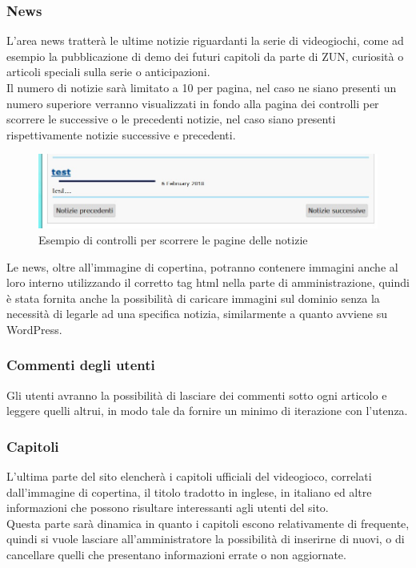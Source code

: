 \documentclass[openany, a4paper, 12pt]{report}
\begin{document}
		\subsubsection{News}
		L'area news tratterà le ultime notizie riguardanti la serie di videogiochi, come ad esempio la pubblicazione di demo dei futuri capitoli da parte di ZUN, curiosità o articoli speciali sulla serie o anticipazioni.\\
		Il numero di notizie sarà limitato a 10 per pagina, nel caso ne siano presenti un numero superiore verranno visualizzati in fondo alla pagina dei controlli per scorrere le successive o le precedenti notizie, nel caso siano presenti rispettivamente notizie successive e precedenti.
		\begin{figure}[H]
			\centering
			\includegraphics[width=0.8\linewidth]{images/precsuccnews}
			\caption{Esempio di controlli per scorrere le pagine delle notizie}
		\end{figure}
		Le news, oltre all'immagine di copertina, potranno contenere immagini anche al loro interno utilizzando il corretto tag html nella parte di amministrazione, quindi è stata fornita anche la possibilità di caricare immagini sul dominio senza la necessità di legarle ad una specifica notizia, similarmente a quanto avviene su WordPress.

		\subsubsection{Commenti degli utenti}
		Gli utenti avranno la possibilità di lasciare dei commenti sotto ogni articolo e leggere quelli altrui, in modo tale da fornire un minimo di iterazione con l'utenza.

		\subsubsection{Capitoli}
		L'ultima parte del sito elencherà i capitoli ufficiali del videogioco, correlati dall'immagine di copertina, il titolo tradotto in inglese, in italiano ed altre informazioni che possono risultare interessanti agli utenti del sito.\\
		Questa parte sarà dinamica in quanto i capitoli escono relativamente di frequente, quindi si vuole lasciare all'amministratore la possibilità di inserirne di nuovi, o di cancellare quelli che presentano informazioni errate o non aggiornate.
\end{document}
